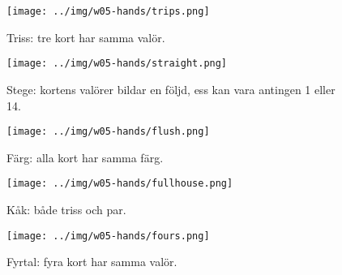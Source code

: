 \begin{figure}[H]
 \begin{minipage}[c]{\CardWidth}
  \texttt{[image: ../img/w05-hands/trips.png]}
 \end{minipage}
 \begin{minipage}[c]{\CardCaptionWidth}
  \caption{Triss: tre kort har samma valör.}
 \end{minipage}
\end{figure}

\begin{figure}[H]
 \begin{minipage}[c]{\CardWidth}
  \texttt{[image: ../img/w05-hands/straight.png]}
 \end{minipage}
 \begin{minipage}[c]{\CardCaptionWidth}
  \caption{Stege: kortens valörer bildar en följd, ess kan vara antingen 1 eller 14.}
 \end{minipage}
\end{figure}

\begin{figure}[H]
 \begin{minipage}[c]{\CardWidth}
  \texttt{[image: ../img/w05-hands/flush.png]}
 \end{minipage}
 \begin{minipage}[c]{\CardCaptionWidth}
  \caption{Färg: alla kort har samma färg.}
 \end{minipage}
\end{figure}

\begin{figure}[H]
 \begin{minipage}[c]{\CardWidth}
  \texttt{[image: ../img/w05-hands/fullhouse.png]}
 \end{minipage}
 \begin{minipage}[c]{\CardCaptionWidth}
  \caption{Kåk: både triss och par.}
 \end{minipage}
\end{figure}

\begin{figure}[H]
 \begin{minipage}[c]{\CardWidth}
  \texttt{[image: ../img/w05-hands/fours.png]}
 \end{minipage}
 \begin{minipage}[c]{\CardCaptionWidth}
  \caption{Fyrtal: fyra kort har samma valör.}
 \end{minipage}
\end{figure}

